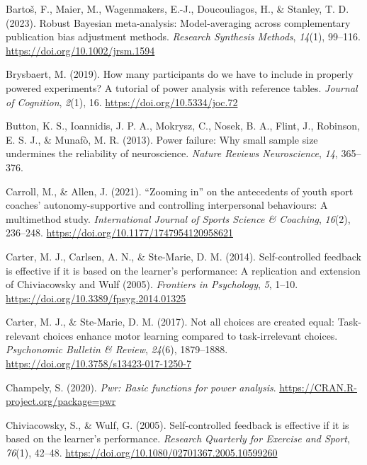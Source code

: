 \documentclass[
  man, donotrepeattitle,mask,floatsintext]{apa7}
\newlength{\cslhangindent}
\newlength{\cslentryspacingunit} %
\newenvironment{CSLReferences}[2] %
 {%
  \setlength{\parindent}{0pt}
  \ifodd #1
  \let\oldpar\par
  \def\par{\hangindent=\cslhangindent\oldpar}
  \fi
  \setlength{\parskip}{#2\cslentryspacingunit}
 }%
 {}
\begin{document}
\begin{CSLReferences}{1}{0}
\leavevmode{}%
Bartoš, F., Maier, M., Wagenmakers, E.-J., Doucouliagos, H., \& Stanley, T. D. (2023). Robust {Bayesian} meta-analysis: {Model}-averaging across complementary publication bias adjustment methods. \emph{Research Synthesis Methods}, \emph{14}(1), 99--116. \url{https://doi.org/10.1002/jrsm.1594}

\leavevmode{}%
Brysbaert, M. (2019). How many participants do we have to include in properly powered experiments? {A} tutorial of power analysis with reference tables. \emph{Journal of Cognition}, \emph{2}(1), 16. \url{https://doi.org/10.5334/joc.72}

\leavevmode{}%
Button, K. S., Ioannidis, J. P. A., Mokrysz, C., Nosek, B. A., Flint, J., Robinson, E. S. J., \& Munafò, M. R. (2013). Power failure: {Why} small sample size undermines the reliability of neuroscience. \emph{Nature Reviews Neuroscience}, \emph{14}, 365--376.

\leavevmode{}%
Carroll, M., \& Allen, J. (2021). {``{Zooming} in''} on the antecedents of youth sport coaches' autonomy-supportive and controlling interpersonal behaviours: A multimethod study. \emph{International Journal of Sports Science \& Coaching}, \emph{16}(2), 236--248. \url{https://doi.org/10.1177/1747954120958621}

\leavevmode{}%
Carter, M. J., Carlsen, A. N., \& Ste-Marie, D. M. (2014). Self-controlled feedback is effective if it is based on the learner's performance: {A} replication and extension of {Chiviacowsky} and {Wulf} (2005). \emph{Frontiers in Psychology}, \emph{5}, 1--10. \url{https://doi.org/10.3389/fpsyg.2014.01325}

\leavevmode{}%
Carter, M. J., \& Ste-Marie, D. M. (2017). Not all choices are created equal: {Task-relevant} choices enhance motor learning compared to task-irrelevant choices. \emph{Psychonomic Bulletin \& Review}, \emph{24}(6), 1879--1888. \url{https://doi.org/10.3758/s13423-017-1250-7}

\leavevmode{}%
Champely, S. (2020). \emph{Pwr: Basic functions for power analysis}. \url{https://CRAN.R-project.org/package=pwr}

\leavevmode{}%
Chiviacowsky, S., \& Wulf, G. (2005). Self-controlled feedback is effective if it is based on the learner's performance. \emph{Research Quarterly for Exercise and Sport}, \emph{76}(1), 42--48. \url{https://doi.org/10.1080/02701367.2005.10599260}


\end{CSLReferences}
\end{document}
